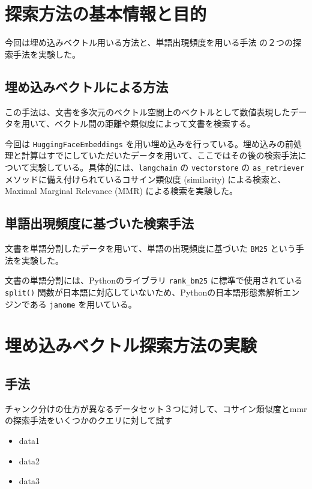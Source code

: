\section{探索方法の基本情報と目的}
今回は埋め込みベクトル用いる方法と、単語出現頻度を用いる手法 の２つの探索手法を実験した。

\subsection{埋め込みベクトルによる方法}
この手法は、文書を多次元のベクトル空間上のベクトルとして数値表現したデータを用いて、ベクトル間の距離や類似度によって文書を検索する。 \par
今回は \texttt{HuggingFaceEmbeddings} を用い埋め込みを行っている。埋め込みの前処理と計算はすでにしていただいたデータを用いて、ここではその後の検索手法について実験している。具体的には、\texttt{langchain} の \texttt{vectorstore} の \texttt{as\_retriever} メソッドに備え付けられているコサイン類似度 (similarity) による検索と、Maximal Marginal Relevance (MMR) による検索を実験した。 \par

\subsection{単語出現頻度に基づいた検索手法}
文書を単語分割したデータを用いて、単語の出現頻度に基づいた \texttt{BM25} という手法を実験した。 \par
文書の単語分割には、Pythonのライブラリ \texttt{rank\_bm25} に標準で使用されている \texttt{split()} 関数が日本語に対応していないため、Pythonの日本語形態素解析エンジンである \texttt{janome} を用いている。 \par

\section{埋め込みベクトル探索方法の実験}
\subsection{手法}
チャンク分けの仕方が異なるデータセット３つに対して、コサイン類似度とmmrの探索手法をいくつかのクエリに対して試す
\begin{itemize}
 \item data1
 \item data2
 \item data3
\end{itemize}

